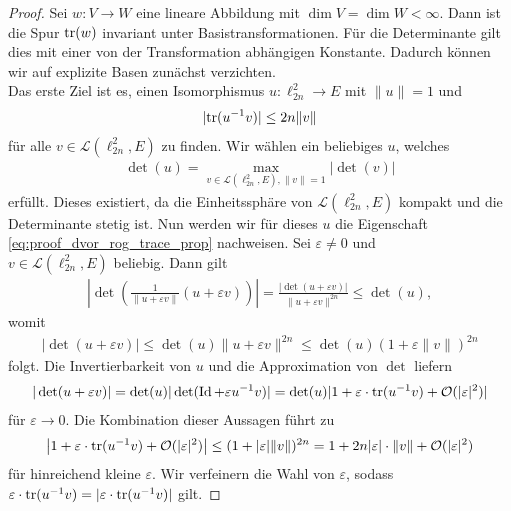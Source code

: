 \begin{proof}
	Sei $ w : V \to W $ eine lineare Abbildung mit $ \dim V = \dim W < \infty $.
	Dann ist die Spur $ \mathrm{tr} (w) $ invariant unter Basistransformationen.
	Für die Determinante gilt dies mit einer von der Transformation abhängigen Konstante. Dadurch können wir auf explizite Basen zunächst verzichten.\\
	Das erste Ziel ist es, einen Isomorphismus $ u : \ell^2_{2n}  \to E$ mit $ \| u \| = 1 $ und 
	\begin{align}\label{eq:proof_dvor_rog_trace_prop}
		| \mathrm{tr}(u^{-1} v) | \leq 2n \| v \|
	\end{align}
	für alle $ v \in \mathcal{L}(\ell^2_{2n}, E ) $ zu finden.
	Wir wählen ein beliebiges $ u $, welches 
	\begin{align*}
		\det(u)
		=
		\max \limits_{v \in \mathcal{L}(\ell^2_{2n}, E ) , \| v \| = 1  } | \det(v) |
	\end{align*}
	erfüllt. Dieses existiert, da die Einheitssphäre von $ \mathcal{L}(\ell^2_{2n} , E) $ kompakt und die Determinante stetig ist. Nun werden wir für dieses $ u $
	die Eigenschaft \eqref{eq:proof_dvor_rog_trace_prop} nachweisen.
	Sei $ \varepsilon \neq 0  $ und \\ $ v \in \mathcal{L}(\ell^2_{2n} , E) $ beliebig.
	Dann gilt
	\begin{align*}
		\left|\det \left(
		\frac{1}{\| u + \varepsilon v \|} ( u + \varepsilon v)
		\right)\right|
		=
		\frac{| \det(u + \varepsilon v ) |}{\| u + \varepsilon v \|^{2n}}
		\leq \det(u),
	\end{align*}
	womit 
	\begin{align*}
		|\det ( u + \varepsilon  v) |
		\leq \det(u) \| u + \varepsilon v \|^{2n}
		\leq  \det(u) (1 + \varepsilon \|v \|)^{2n}
	\end{align*}
	folgt.
	Die Invertierbarkeit von $ u $ und die Approximation von $ \det $ liefern
	\begin{align*}
		| \det (u + \varepsilon v ) |
		=
		\det(u) |\det(\operatorname{Id} + \varepsilon u^{-1} v ) |
		=
		\det(u) | 1 + \varepsilon\cdot \mathrm{tr}(u^{-1} v) + \mathcal{O}(|\varepsilon|^2) |
	\end{align*}
	für $ \varepsilon \to 0 $.
	Die Kombination dieser Aussagen führt zu 
	\begin{align*}
		\left| 1 + \varepsilon \cdot\mathrm{tr}(u^{-1} v) + \mathcal{O}(|\varepsilon|^2) \right|
		\leq (1+ |\varepsilon| \| v \| )^{2n} = 1 + 2n |\varepsilon | \cdot \|v\| + \mathcal{O}(|\varepsilon|^2)
	\end{align*}
	für hinreichend kleine $ \varepsilon $. Wir verfeinern die Wahl von $ \varepsilon $, sodass $ \varepsilon \cdot\mathrm{tr}(u^{-1} v) = | \varepsilon \cdot\mathrm{tr}(u^{-1} v)| $ gilt.

\end{proof}
